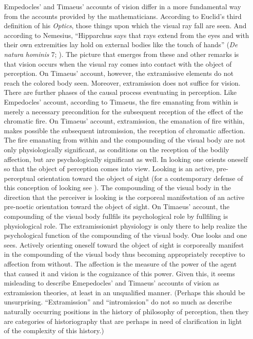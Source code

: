 Empedocles' and Timaeus' accounts of vision differ in a more fundamental way from the accounts provided by the mathematicians. According to Euclid's third definition of his \emph{Optics}, those things upon which the visual ray fall are seen. And according to Nemesius, ``Hipparchus says that rays extend from the eyes and with their own extremities lay hold on external bodies like the touch of hands'' (\emph{De natura hominis} 7; \citealt[104]{Sharples:2008aa}). The picture that emerges from these and other remarks is that vision occurs when the visual ray comes into contact with the object of perception. On Timaeus' account, however, the extramissive elements do not reach the colored body seen. Moreover, extramission does not suffice for vision. There are further phases of the causal process eventuating in perception. Like Empedocles' account, according to Timaeus, the fire emanating from within is merely a necessary precondition for the subsequent reception of the effect of the chromatic fire. On Timaeus' account, extramission, the emanation of fire within, makes possible the subsequent intromission, the reception of chromatic affection. The fire emanating from within and the compounding of the visual body are not only physiologically significant, as conditions on the reception of the bodily affection, but are psychologically significant as well. In looking one orients oneself so that the object of perception comes into view. Looking is an active, pre-perceptual orientation toward the object of sight (for a contemporary defense of this conception of looking see \citealt[chapter 5]{Kalderon:2018oe}). The compounding of the visual body in the direction that the perceiver is looking is the corporeal manifestation of an active pre-noetic orientation toward the object of sight. On Timaeus' account, the compounding of the visual body fullfils its psychological role by fullfiling is physiological role. The extramissionist physiology is only there to help realize the psychological function of the compounding of the visual body. One looks and one sees. Actively orienting oneself toward the object of sight is corporeally manifest in the compounding of the visual body thus becoming appropriately receptive to affection from without. The affection is the measure of the power of the agent that caused it and vision is the cognizance of this power. Given this, it seems misleading to describe Emepedocles' and Timaeus' accounts of vision as extramission theories, at least in an unqualified manner. (Perhaps this should be unsurprising. ``Extramission'' and ``intromission'' do not so much as describe naturally occurring positions in the history of philosophy of perception, then they are categories of historiography that are perhaps in need of clarification in light of the complexity of this history.)

